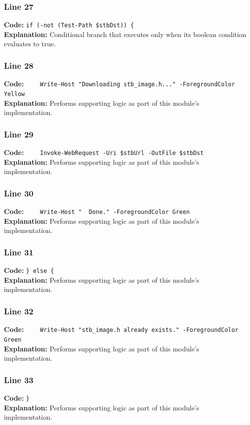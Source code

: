 \documentclass[11pt,a4paper]{article}
\begin{document}
\subsubsection*{Line 27}
\textbf{Code:} \verb|if (-not (Test-Path $stbDst)) {|\\
\textbf{Explanation:} Conditional branch that executes only when its boolean condition evaluates to true.

\subsubsection*{Line 28}
\textbf{Code:} \verb|    Write-Host "Downloading stb_image.h..." -ForegroundColor Yellow|\\
\textbf{Explanation:} Performs supporting logic as part of this module's implementation.

\subsubsection*{Line 29}
\textbf{Code:} \verb|    Invoke-WebRequest -Uri $stbUrl -OutFile $stbDst|\\
\textbf{Explanation:} Performs supporting logic as part of this module's implementation.

\subsubsection*{Line 30}
\textbf{Code:} \verb|    Write-Host "  Done." -ForegroundColor Green|\\
\textbf{Explanation:} Performs supporting logic as part of this module's implementation.

\subsubsection*{Line 31}
\textbf{Code:} \verb|} else {|\\
\textbf{Explanation:} Performs supporting logic as part of this module's implementation.

\subsubsection*{Line 32}
\textbf{Code:} \verb|    Write-Host "stb_image.h already exists." -ForegroundColor Green|\\
\textbf{Explanation:} Performs supporting logic as part of this module's implementation.

\subsubsection*{Line 33}
\textbf{Code:} \verb|}|\\
\textbf{Explanation:} Performs supporting logic as part of this module's implementation.
\end{document}
